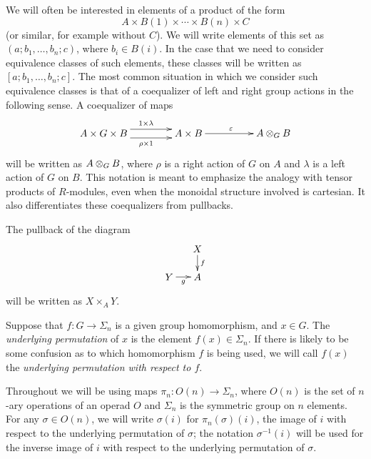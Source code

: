 \begin{conv}\label{conv:coeq}
We will often be interested in elements of a product of the form
\[
A \times B(1) \times \cdots \times B(n) \times C
\]
(or similar, for example without $C$). We will write elements of this set as $(a; b_{1}, \ldots, b_{n}; c)$, where $b_i \in B(i)$. 
In the case that we need to consider equivalence classes of such elements, these classes will be written as $[a; b_{1}, \ldots, b_{n}; c]$. 
The most common situation in which we consider such equivalence classes is that of a coequalizer of left and right group actions in the following sense. 
A coequalizer of maps
    \[
        \xy
            (0,0)*+{A \times G \times B}="00";
            (30,0)*+{A \times B}="10";
            (60,0)*+{\coeqb{A}{B}{G}}="20";
            {\ar@<1ex>^{1 \times \lambda} "00" ; "10"};
            {\ar@<-1ex>_{\rho \times 1} "00" ; "10"};
            {\ar^{\varepsilon} "10" ; "20"};
        \endxy
    \]
will be written as $\coeqb{A}{B}{G}$, where $\rho$ is a right action of $G$ on $A$ and $\lambda$ is a left action of $G$ on $B$. 
This notation is meant to emphasize the analogy with tensor products of $R$-modules, even when the monoidal structure involved is cartesian.
It also differentiates these coequalizers from pullbacks.
\end{conv}


\begin{conv}[(Pullbacks)]\label{conv:pb}
The pullback of the diagram
    \[
        \xy
            (10,0)*+{X}="00";
            (0,-10)*+{Y}="10";
            (10,-10)*+{A}="20";
            {\ar^{f} "00" ; "20"};
            {\ar_{g} "10" ; "20"};
        \endxy
    \]
will be written as $X \times_A Y$. 
\end{conv}

\begin{Defi}\label{Defi:underlying-perm}
Suppose that $f \colon G \to \Sigma_n$ is a given group homomorphism, and $x \in G$. The \emph{underlying permutation} of $x$ is the element $f(x) \in \Sigma_n$. If there is likely to be some confusion as to which homomorphism $f$ is being used, we will call $f(x)$ the \emph{underlying permutation with respect to $f$}.
\end{Defi}

\begin{nota}\label{nota:perm_shorthand}
Throughout we will be using maps $\pi_n \colon O(n) \rightarrow \Sigma_n$, where $O(n)$ is the set of $n$-ary operations of an operad $O$ and $\Sigma_n$ is the symmetric group on $n$ elements.  
For any $\sigma \in O(n)$, we will write $\sigma(i)$ for $\pi_n(\sigma)(i)$, the image of $i$ with respect to the underlying permutation of $\sigma$; the notation $\sigma^{-1}(i)$ will be used for the inverse image of $i$ with respect to the underlying permutation of $\sigma$.
\end{nota}



